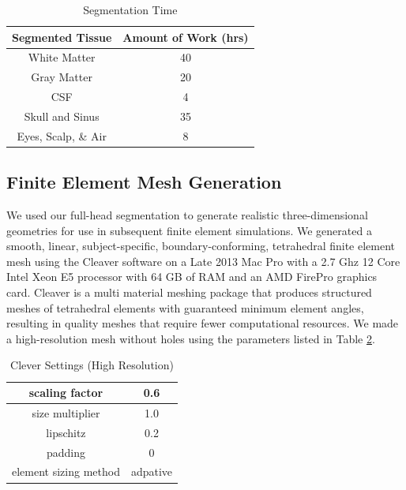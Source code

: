 \begin{table}[H]
\centering
\caption{Segmentation Time}
\label{tab:seg}
\begin{tabular}{|c|c|}
\hline
Segmented Tissue    & Amount of Work (hrs) \\ \hline
White Matter       & 40                   \\ \hline
Gray Matter         & 20                   \\ \hline
CSF                 & 4                    \\ \hline
Skull and Sinus     & 35                   \\ \hline
Eyes, Scalp, \& Air & 8                    \\ \hline
\end{tabular}
\end{table}

\subsection{Finite Element Mesh Generation}
\label{sec:mesh}


We used our full-head segmentation to generate realistic three-dimensional geometries for use in subsequent finite element simulations. We generated a smooth, linear, subject-specific, boundary-conforming, tetrahedral finite element mesh using the Cleaver software \cite{ref:cleaver} on a Late 2013 Mac Pro with a 2.7 Ghz 12 Core Intel Xeon E5 processor with 64 GB of RAM and an AMD FirePro graphics card. Cleaver is a multi material meshing package that produces structured meshes of tetrahedral elements with guaranteed minimum element angles, resulting in quality meshes that require fewer computational resources. We made a high-resolution mesh without holes using the parameters listed in Table \ref{tab:cleaver}.
\begin{table}[H]
\centering
\caption{Clever Settings (High Resolution)}
\label{tab:cleaver}
\begin{tabular}{|c|c|}
\hline
scaling factor                    & 0.6                 \\ \hline
size multiplier                   & 1.0                 \\ \hline
lipschitz                         & 0.2                 \\ \hline
padding                           & 0                   \\ \hline
element sizing method             & adpative            \\ \hline
\end{tabular}
\end{table}

